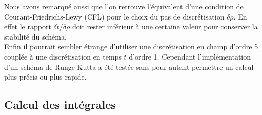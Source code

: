 \documentclass[10.5pt]{article}
\begin{document}
\begin{multicols*}{2}
Nous avons remarqué aussi que l'on retrouve l'équivalent d'une condition de Courant-Friedrichs-Lewy (CFL) \cite{courant1967partial} pour le choix du pas de discrétisation $\delta \rho$. En effet le rapport $\delta t / \delta\rho$ doit rester inférieur à une certaine valeur pour conserver la stabilité du schéma.\\

Enfin il pourrait sembler étrange d'utiliser une discrétisation en champ d'ordre 5 couplée à une discrétisation en temps $t$ d'ordre 1. Cependant l'implémentation d'un schéma de Runge-Kutta a été testée sans pour autant permettre un calcul plus précis ou plus rapide. 




\subsection{Calcul des intégrales}


\end{multicols*}
\end{document}
